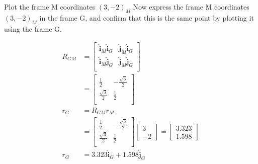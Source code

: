 Plot the frame M coordinates $(3, -2)_M$ Now express the frame M coordinates $(3, -2)_M$ in the frame G, and confirm that this is the same point by plotting it using the frame G.

\begin{solution}
\begin{align*}
    R_{GM} &= \begin{bmatrix}
        \boldsymbol{\hat{i}}_M \boldsymbol{\hat{i}}_G & \boldsymbol{\hat{j}}_M \boldsymbol{\hat{i}}_G \\
        \boldsymbol{\hat{i}}_M \boldsymbol{\hat{j}}_G & \boldsymbol{\hat{j}}_M \boldsymbol{\hat{j}}_G \\
    \end{bmatrix} \\
    &= \begin{bmatrix}
        \frac{1}{2} & -\frac{\sqrt{3}}{2} \\
        \frac{\sqrt{3}}{2} & \frac{1}{2} \\
    \end{bmatrix} \\
    r_G &= R_{GM} r_M \\
    &= \begin{bmatrix}
        \frac{1}{2} & -\frac{\sqrt{3}}{2} \\
        \frac{\sqrt{3}}{2} & \frac{1}{2} \\
    \end{bmatrix} \begin{bmatrix}
        3 \\ -2
    \end{bmatrix} = \begin{bmatrix}
        3.323 \\ 1.598
    \end{bmatrix} \\
    r_G &= 3.323 \boldsymbol{\hat{i}}_G + 1.598 \boldsymbol{\hat{j}}_G
\end{align*}

\begin{center}
\end{center}
\end{solution}